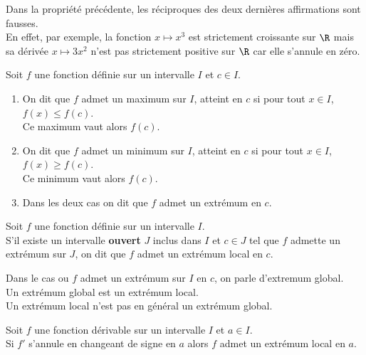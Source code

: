 \documentclass[a4paper,11pt,cours]{nsi} %
\begin{document}
\begin{remarque}[]
	Dans la propriété précédente, les réciproques des deux dernières affirmations sont fausses.\\
	En effet, par exemple, la fonction $x\mapsto x^3$ est strictement croissante sur $\R$ mais sa dérivée $x\mapsto 3x^2$ n'est pas strictement 
	positive sur $\R$ car elle s'annule en zéro.
\end{remarque}


\begin{definition}[s]
	Soit $f$ une fonction définie sur un intervalle $I$ et $c\in I$.
	\begin{enumerate}[label=\textbullet]
		\item 	On dit que $f$ admet un maximum sur $I$, atteint en $c$ si pour tout $x\in I$, $f(x)\leqslant f(c)$.\\
		Ce maximum vaut alors $f(c)$.
		\item 	On dit que $f$ admet un minimum sur $I$, atteint en $c$ si pour tout $x\in I$, $f(x)\geqslant f(c)$.\\
		Ce minimum vaut alors $f(c)$.
		\item 	Dans les deux cas on dit que $f$ admet un extrémum en $c$.
	\end{enumerate}
\end{definition}


\begin{definition}[]
	Soit $f$ une fonction définie sur un intervalle $I$.\\
	S'il existe un intervalle \textbf{ouvert }$J$ inclus dans $I$ et $c\in J$ tel que $f$ admette un extrémum sur $J$, on dit que $f$ 
	admet un extrémum local en $c$.
\end{definition}

\begin{remarque}[]
	Dans le cas ou $f$ admet un extrémum sur $I$ en $c$, on parle d'extremum global.\\
	Un extrémum global est un extrémum local.\\
	Un extrémum local n'est pas en général un extrémum global.
\end{remarque}

\begin{propriete}[]
	Soit $f$ une fonction dérivable sur un intervalle $I$ et $a\in I$.\\
	Si $f'$ s'annule en changeant de signe en $a$ alors $f$ admet un extrémum local en $a$.
\end{propriete}

\newpage
\end{document}
